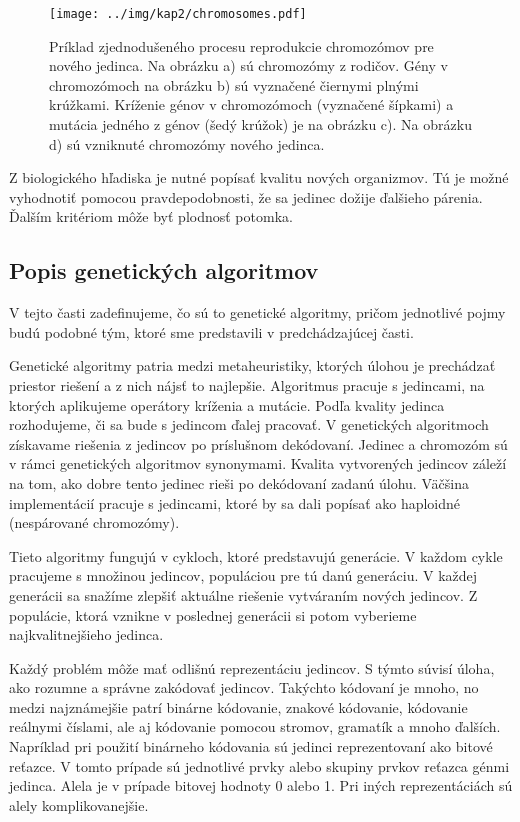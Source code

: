 \begin{figure}[h]
\centering
\centerline{\mbox{\texttt{[image: ../img/kap2/chromosomes.pdf]}}}
\caption{Príklad zjednodušeného procesu reprodukcie chromozómov pre nového jedinca. Na obrázku a) sú chromozómy z rodičov. Gény v chromozómoch na obrázku b) sú vyznačené čiernymi plnými krúžkami. Kríženie génov v chromozómoch (vyznačené šípkami) a mutácia jedného z génov (šedý krúžok) je na obrázku c). Na obrázku d) sú vzniknuté chromozómy nového jedinca.}\label{fig:Chromosomes}
\end{figure}

Z biologického hľadiska je nutné popísať kvalitu nových organizmov. Tú je možné vyhodnotiť pomocou pravdepodobnosti, že sa jedinec dožije ďalšieho párenia. Ďalším kritériom môže byť plodnosť potomka.

\subsection{Popis genetických algoritmov}\label{kap2:2.1:2.1.2:AboutGeneticAlgo}
V tejto časti zadefinujeme, čo sú to genetické algoritmy, pričom jednotlivé pojmy budú podobné tým, ktoré sme predstavili v predchádzajúcej časti. 

Genetické algoritmy patria medzi metaheuristiky, ktorých úlohou je prechádzať priestor riešení a z nich nájsť to najlepšie. Algoritmus pracuje s jedincami, na ktorých aplikujeme operátory kríženia a mutácie. Podľa kvality jedinca rozhodujeme, či sa bude s jedincom ďalej pracovať. V genetických algoritmoch získavame riešenia z jedincov po príslušnom dekódovaní. Jedinec a chromozóm sú v rámci genetických algoritmov synonymami. Kvalita vytvorených jedincov záleží na tom, ako dobre tento jedinec rieši po dekódovaní zadanú úlohu. Väčšina implementácií pracuje s jedincami, ktoré by sa dali popísať ako haploidné (nespárované chromozómy).

Tieto algoritmy fungujú v cykloch, ktoré predstavujú generácie. V každom cykle pracujeme s množinou jedincov, populáciou pre tú danú generáciu. V každej generácii sa snažíme zlepšiť aktuálne riešenie vytváraním nových jedincov. Z populácie, ktorá vznikne v poslednej generácii si potom vyberieme najkvalitnejšieho jedinca.

Každý problém môže mať odlišnú reprezentáciu jedincov. S týmto súvisí úloha, ako rozumne a správne zakódovať jedincov. Takýchto kódovaní je mnoho, no medzi najznámejšie patrí binárne kódovanie, znakové kódovanie, kódovanie reálnymi číslami, ale aj kódovanie pomocou stromov, gramatík a mnoho ďalších. Napríklad pri použití binárneho kódovania sú jedinci reprezentovaní ako bitové reťazce. V tomto prípade sú jednotlivé prvky alebo skupiny prvkov reťazca génmi jedinca. Alela je v prípade bitovej hodnoty 0 alebo 1. Pri iných reprezentáciách sú alely komplikovanejšie.

